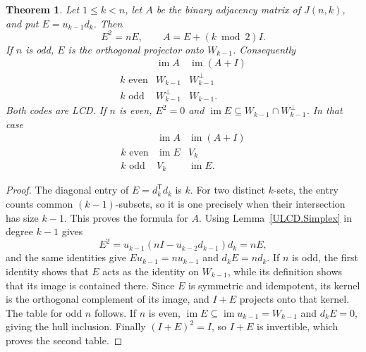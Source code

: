\documentclass[11pt,a4paper]{article}
\newtheorem{theorem}{Theorem}[section]
\numberwithin{equation}{section}
\newcommand{\im}{\operatorname{im}}
\begin{document}
\begin{theorem}\label{ULCD.Johnson}
Let $1\leq k<n$, let $A$ be the binary adjacency matrix of $J(n,k)$, and
put $E=u_{k-1}d_k$. Then
\[
 E^2=nE,\qquad A=E+(k\bmod2)I.
\]
If $n$ is odd, $E$ is the orthogonal projector onto $W_{k-1}$. Consequently
\[
\begin{array}{c|cc}
 &\im A&\im(A+I)\\\hline
k\text{ even}&W_{k-1}&W_{k-1}^{\perp}\\
k\text{ odd}&W_{k-1}^{\perp}&W_{k-1}.
\end{array}
\]
Both codes are LCD. If $n$ is even, $E^2=0$ and
$\im E\subseteq W_{k-1}\cap W_{k-1}^{\perp}$. In that case
\[
\begin{array}{c|cc}
 &\im A&\im(A+I)\\\hline
k\text{ even}&\im E&V_k\\
k\text{ odd}&V_k&\im E.
\end{array}
\]
\end{theorem}
\begin{proof}
The diagonal entry of $E=d_k^{\mathsf T}d_k$ is $k$. For two distinct
$k$-sets, the entry counts common $(k-1)$-subsets, so it is one precisely
when their intersection has size $k-1$. This proves the formula for $A$.
Using Lemma~\ref{ULCD.Simplex} in degree $k-1$ gives
\[
 E^2=u_{k-1}(nI-u_{k-2}d_{k-1})d_k=nE,
\]
and the same identities give
$E u_{k-1}=n u_{k-1}$ and $d_kE=n d_k$.
If $n$ is odd, the first identity shows that $E$ acts as the identity on
$W_{k-1}$, while its definition shows that its image is contained there.
Since $E$ is symmetric and idempotent, its kernel is the orthogonal
complement of its image, and $I+E$ projects onto that kernel.
The table for odd $n$ follows.
If $n$ is even, $\im E\subseteq\im u_{k-1}=W_{k-1}$ and $d_kE=0$, giving
the hull inclusion. Finally $(I+E)^2=I$, so $I+E$ is invertible, which proves
the second table.
\end{proof}
\end{document}
